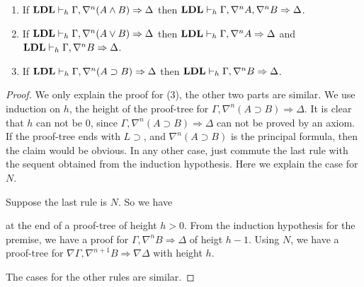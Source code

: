 
\begin{lem}[Inversion]\label{lem:inv} \quad
	\begin{enumerate}
		\item If $\LDL \vdash_h \Gamma, \nabla^n (A \wedge B) \Rightarrow \Delta$ then $\LDL \vdash_h \Gamma, \nabla^n A, \nabla^n B \Rightarrow \Delta$.
		\item If $\LDL \vdash_h \Gamma, \nabla^n (A \vee B) \Rightarrow \Delta$ then $\LDL \vdash_h \Gamma, \nabla^n A \Rightarrow \Delta$ and $\LDL \vdash_h \Gamma, \nabla^n B \Rightarrow \Delta$.
  	\item If $\LDL \vdash_h \Gamma, \nabla^n (A \supset B) \Rightarrow \Delta$ then $\LDL \vdash_h \Gamma, \nabla^n B \Rightarrow \Delta$.
	\end{enumerate}
\end{lem}
\begin{proof}
  We only explain the proof for (3), the other two parts are similar. We use induction on $h$, the height of the proof-tree for $\Gamma, \nabla^n (A \supset B) \Rightarrow \Delta$. It is clear that $h$ can not be $0$, since $\Gamma, \nabla^n (A \supset B) \Rightarrow \Delta$ can not be proved by an axiom. If the proof-tree ends with $L \supset$, and $\nabla^n (A \supset B)$ is the principal formula, then the claim would be obvious. In any other case, just commute the last rule with the sequent obtained from the induction hypothesis. Here we explain the case for $N$.

  Suppose the last rule is $N$. So we have
  \begin{prooftree}
     
  \end{prooftree}
  at the end of a proof-tree of height $h > 0$. From the induction hypothesis for the premise, we have a proof for $\Gamma, \nabla^n B \Rightarrow \Delta$ of heigt $h - 1$. Using $N$, we have a proof-tree for $\nabla \Gamma, \nabla^{n+1} B \Rightarrow \nabla \Delta$ with height $h$.

  The cases for the other rules are similar.
\end{proof}